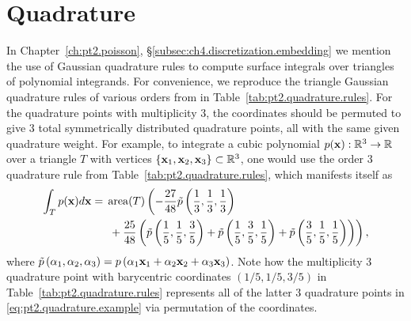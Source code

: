 %

\chapter{Quadrature} \label{ch:pt2.appendix.quadrature}

In Chapter~\ref{ch:pt2.poisson}, \S\ref{subsec:ch4.discretization.embedding} we mention the use of Gaussian quadrature rules to compute surface integrals over triangles of polynomial integrands. For convenience, we reproduce the triangle Gaussian quadrature rules of various orders from \cite{Cowper73} in Table~\ref{tab:pt2.quadrature.rules}. For the quadrature points with multiplicity $3$, the coordinates should be permuted to give $3$ total symmetrically distributed quadrature points, all with the same given quadrature weight. For example, to integrate a cubic polynomial $p(\mathbf{x}) : \mathbb{R}^3 \to \mathbb{R}$ over a triangle $T$ with vertices $\{\mathbf{x}_1, \mathbf{x}_2, \mathbf{x}_3\} \subset \mathbb{R}^3$, one would use the order $3$ quadrature rule from Table~\ref{tab:pt2.quadrature.rules}, which manifests itself as
\begin{equation} \label{eq:pt2.quadrature.example}
\begin{split}
\int_T p(\mathbf{x}) d\mathbf{x} = {} & \operatorname{area}(T) \left( -\frac{27}{48} \tilde{p} \left( \frac{1}{3}, \frac{1}{3}, \frac{1}{3} \right) \right. \\ & \left. {} + \frac{25}{48} \left( \tilde{p} \left( \frac{1}{5}, \frac{1}{5}, \frac{3}{5} \right) + \tilde{p} \left( \frac{1}{5}, \frac{3}{5}, \frac{1}{5} \right) + \tilde{p} \left( \frac{3}{5}, \frac{1}{5}, \frac{1}{5} \right) \right) \right),
\end{split}
\end{equation}
where $\tilde{p} \left( \alpha_1, \alpha_2, \alpha_3 \right) = p \left( \alpha_1 \mathbf{x}_1 + \alpha_2 \mathbf{x}_2 + \alpha_3 \mathbf{x}_3 \right)$. Note how the multiplicity $3$ quadrature point with barycentric coordinates $(1/5, 1/5, 3/5)$ in Table~\ref{tab:pt2.quadrature.rules} represents all of the latter $3$ quadrature points in \eqref{eq:pt2.quadrature.example} via permutation of the coordinates.

